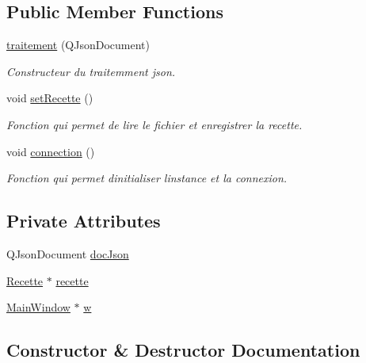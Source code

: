 \subsection*{Public Member Functions}
\begin{DoxyCompactItemize}
\item 
\hyperlink{classtraitement_aed3a0890dc897f3e1f3c254fa7adf7ca}{traitement} (Q\+Json\+Document)
\begin{DoxyCompactList}\small\item\em Constructeur du traitemment json. \end{DoxyCompactList}\item 
void \hyperlink{classtraitement_a2a9559686027b1ac30fdce7c62cb1172}{set\+Recette} ()
\begin{DoxyCompactList}\small\item\em Fonction qui permet de lire le fichier et enregistrer la recette. \end{DoxyCompactList}\item 
void \hyperlink{classtraitement_a2ce2b64928d33b331a8f67857ca22e74}{connection} ()
\begin{DoxyCompactList}\small\item\em Fonction qui permet d\textquotesingle{}initialiser l\textquotesingle{}instance et la connexion. \end{DoxyCompactList}\end{DoxyCompactItemize}
\subsection*{Private Attributes}
\begin{DoxyCompactItemize}
\item 
Q\+Json\+Document \hyperlink{classtraitement_a106b236f1bc787e5c64145c587f8c541}{doc\+Json}
\item 
\hyperlink{classRecette}{Recette} $\ast$ \hyperlink{classtraitement_a5cf1eecd93636a2d98963125b35b1f64}{recette}
\item 
\hyperlink{classMainWindow}{Main\+Window} $\ast$ \hyperlink{classtraitement_a02be510f3a7838494b6d3531f8accfbd}{w}
\end{DoxyCompactItemize}


\subsection{Constructor \& Destructor Documentation}
\mbox{\label{classtraitement_aed3a0890dc897f3e1f3c254fa7adf7ca}} 
